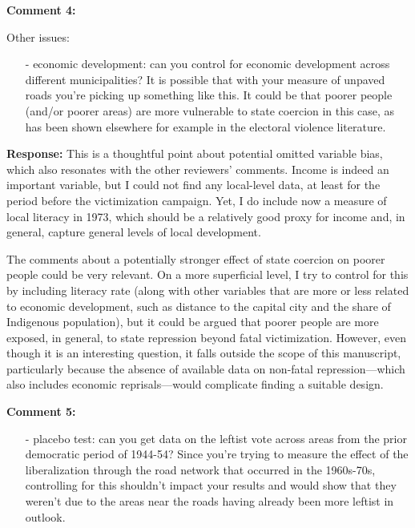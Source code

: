 \documentclass[12pt, a4paper, notitlepage]{article}
\begin{document}
\vspace{15pt}
\noindent\textbf{Comment 4:}
\begin{displayquote}
Other issues:

\begin{itemize}
\item[-] economic development: can you control for economic development across different municipalities? It is possible that with your measure of unpaved roads you’re picking up something like this. It could be that poorer people (and/or poorer areas) are more vulnerable to state coercion in this case, as has been shown elsewhere for example in the electoral violence literature.
\end{itemize}
\end{displayquote}

\noindent\textbf{Response:} This is a thoughtful point about potential omitted variable bias, which also resonates with the other reviewers' comments. Income is indeed an important variable, but I could not find any local-level data, at least for the period before the victimization campaign. Yet, I do include now a measure of local literacy in 1973, which should be a relatively good proxy for income and, in general, capture general levels of local development.

The comments about a potentially stronger effect of state coercion on poorer people could be very relevant. On a more superficial level, I try to control for this by including literacy rate (along with other variables that are more or less related to economic development, such as distance to the capital city and the share of Indigenous population), but it could be argued that poorer people are more exposed, in general, to state repression beyond fatal victimization. However, even though it is an interesting question, it falls outside the scope of this manuscript, particularly because the absence of available data on non-fatal repression---which also includes economic reprisals---would complicate finding a suitable design.

\vspace{15pt}
\noindent\textbf{Comment 5:}
\begin{displayquote}
\begin{itemize}
\item[-] placebo test: can you get data on the leftist vote across areas from the prior democratic period of 1944-54? Since you’re trying to measure the effect of the liberalization through the road network that occurred in the 1960s-70s, controlling for this shouldn’t impact your results and would show that they weren’t due to the areas near the roads having already been more leftist in outlook.
\end{itemize}
\end{displayquote}
\end{document}
